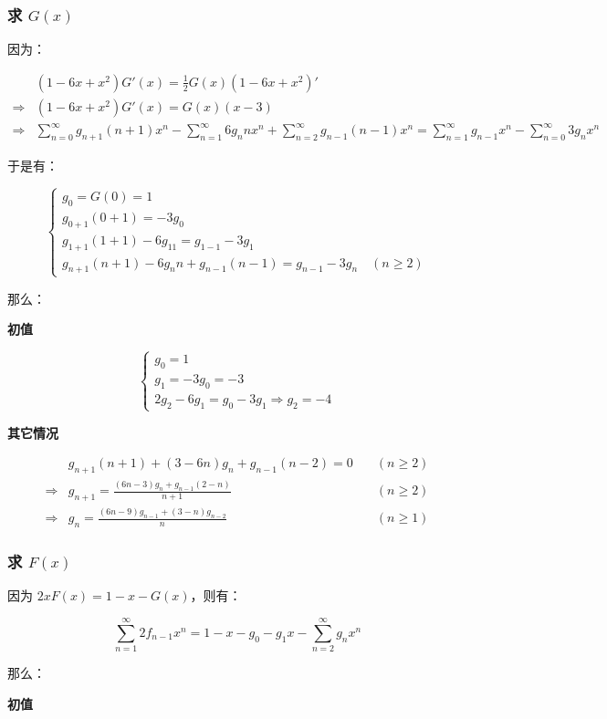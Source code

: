 \documentclass[UTF8]{article}
\begin{document}
\subsubsection{求 $G(x)$}

因为：

$$
\begin{aligned}
&(1-6x+x^2)G'(x)=\frac{1}{2}G(x)(1-6x+x^2)' \\
\Rightarrow &(1-6x+x^2)G'(x)=G(x)(x-3) \\
\Rightarrow &\sum_{n=0}^{\infty}g_{n+1}(n+1)x^{n}-\sum_{n=1}^{\infty}6g_{n}nx^n+\sum_{n=2}^{\infty}g_{n-1}(n-1)x^n=\sum_{n=1}^{\infty}g_{n-1}x^n-\sum_{n=0}^{\infty} 3g_nx^n
\end{aligned}
$$

于是有：

$$
\begin{cases}
g_0=G(0)=1 \\
g_{0+1}(0+1)=-3g_0 \\
g_{1+1}(1+1)-6g_11=g_{1-1}-3g_1 \\
g_{n+1}(n+1)-6g_nn+g_{n-1}(n-1)=g_{n-1}-3g_n \quad (n \ge 2)
\end{cases}
$$

那么：

\textbf{初值}

$$
\begin{cases}
g_0=1 \\
g_1=-3g_0=-3 \\
2g_2-6g_1=g_0-3g_1 \Rightarrow g_2=-4
\end{cases}
$$

\textbf{其它情况}

$$
\begin{aligned}
&g_{n+1}(n+1)+(3-6n)g_n+g_{n-1}(n-2)=0 \quad & (n \ge 2) \\
\Rightarrow &g_{n+1}=\frac{(6n-3)g_n+g_{n-1}(2-n)}{n+1} \quad & (n \ge 2) \\
\Rightarrow &g_{n}=\frac{(6n-9)g_{n-1}+(3-n)g_{n-2}}{n} \quad & (n \ge 1)
\end{aligned}
$$

\subsubsection{求 $F(x)$}

因为 $2xF(x)=1-x-G(x)$，则有：

$$
\sum_{n=1}^{\infty}2f_{n-1}x^n=1-x-g_0-g_1x-\sum_{n=2}^{\infty}g_nx^n
$$

那么：

\textbf{初值}
\end{document}
